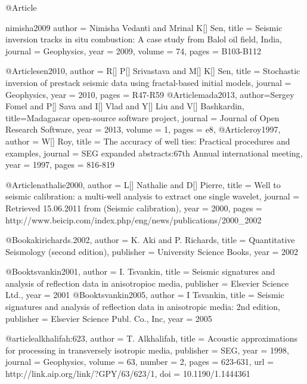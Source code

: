 @Article{nimisha2009
  author = 	 {Nimisha Vedanti and Mrinal K[] Sen},
  title = 	 {Seismic inversion tracks in situ combustion: A case study from Balol oil field, India,
  journal = 	 {Geophysics},
  year = 	 2009,
  volume = 	 74,
  pages = 	 {B103-B112}}
	


@Article{sen2010,
  author = 	 {R[] P[] Srivastava and M[] K[] Sen},
  title = 	 {Stochastic inversion of prestack seismic data using fractal-based initial models},
  journal = 	 {Geophysics},
  year = 	 2010,
  pages =	 {R47-R59}
}
@Article{mada2013,
  author={Sergey Fomel and P[] Sava and I[] Vlad and Y[] Liu and V[] Bashkardin},
  title={Madagascar open-source software project},
  journal = 	 {Journal of Open Research Software},
  year = 	 2013,
  volume =	 1,
  pages =	 {e8},
}
@Article{roy1997,
  author = 	 {W[] Roy},
  title = 	 {The accuracy of well ties: Practical procedures and examples},
  journal = 	 {SEG expanded abstracts:67th Annual international meeting},
  year = 	 1997,
  pages =	 {816-819}
}

@Article{nathalie2000,
  author = 	 {L[] Nathalie and D[] Pierre},
  title = 	 {Well to seismic calibration: a multi-well analysis to extract one single wavelet},
  journal = 	 {Retrieved 15.06.2011 from (Seismic calibration)},
  year = 	 2000,
  pages =	 {http://www.beicip.com/index.php/eng/news/publications/2000\_2002}
}


  
@Book{akirichards.2002,
  author =	 {K. Aki and P. Richards},
  title =	 {Quantitative Seismology (second edition)},
  publisher =	 {University Science Books},
  year =	 2002
}

@Book{tsvankin2001,
  author =	 {I. Tsvankin},
  title =	 {Seismic signatures and analysis of reflection data
                  in anisotropioc media},
  publisher =	 {Elsevier Science Ltd.},
  year =	 2001
}
@Book{tsvankin2005,
  author =	 {I Tsvankin},
  title =	 {Seismic signatures and analysis of reflection data
                  in anisotropic media: 2nd edition},
  publisher =	 {Elsevier Science Publ. Co., Inc},
  year =	 2005
}

@article{alkhalifah:623,
  author =	 {T. Alkhalifah},
  title =	 {Acoustic approximations for processing in
                  transversely isotropic media},
  publisher =	 {SEG},
  year =	 1998,
  journal =	 {Geophysics},
  volume =	 63,
  number =	 2,
  pages =	 {623-631},
  url =		 {http://link.aip.org/link/?GPY/63/623/1},
  doi =		 {10.1190/1.1444361}
}

}

